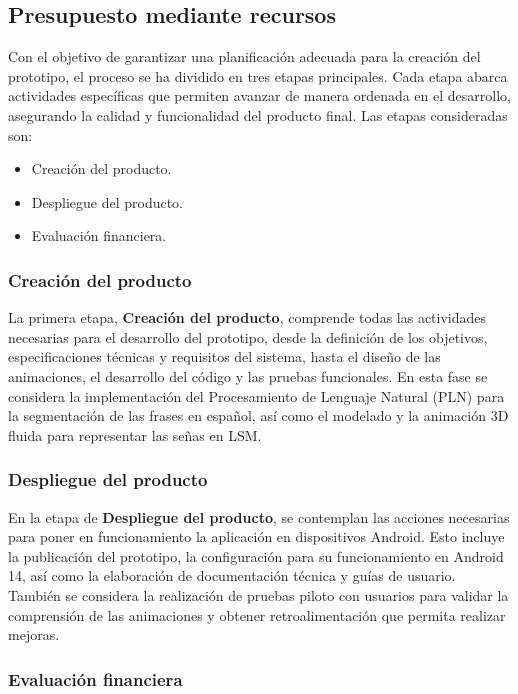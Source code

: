 \subsection*{Presupuesto mediante recursos}

Con el objetivo de garantizar una planificación adecuada para la creación del prototipo, el proceso se ha dividido en tres etapas principales. Cada etapa abarca actividades específicas que permiten avanzar de manera ordenada en el desarrollo, asegurando la calidad y funcionalidad del producto final. Las etapas consideradas son:

\begin{itemize}
	\item Creación del producto.
	\item Despliegue del producto.
	\item Evaluación financiera.
\end{itemize}

\subsubsection*{Creación del producto}

La primera etapa, \textbf{Creación del producto}, comprende todas las actividades necesarias para el desarrollo del prototipo, desde la definición de los objetivos, especificaciones técnicas y requisitos del sistema, hasta el diseño de las animaciones, el desarrollo del código y las pruebas funcionales. En esta fase se considera la implementación del Procesamiento de Lenguaje Natural (PLN) para la segmentación de las frases en español, así como el modelado y la animación 3D fluida para representar las señas en LSM.

\subsubsection*{Despliegue del producto}

En la etapa de \textbf{Despliegue del producto}, se contemplan las acciones necesarias para poner en funcionamiento la aplicación en dispositivos Android. Esto incluye la publicación del prototipo, la configuración para su funcionamiento en Android 14, así como la elaboración de documentación técnica y guías de usuario. También se considera la realización de pruebas piloto con usuarios para validar la comprensión de las animaciones y obtener retroalimentación que permita realizar mejoras.

\subsubsection*{Evaluación financiera}

